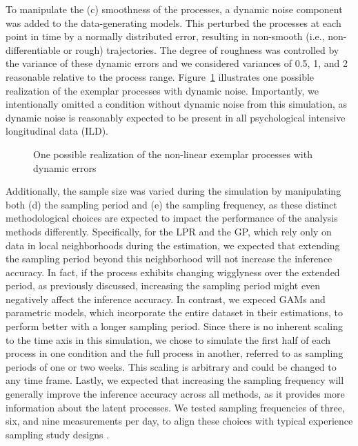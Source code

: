 \documentclass[man, floatsintext]{apa7}
\begin{document}
To manipulate the (c) smoothness of the processes, a dynamic noise
component was added to the data-generating models. This perturbed the
processes at each point in time by a normally distributed error,
resulting in non-smooth (i.e., non-differentiable or rough) trajectories.
The degree of roughness was controlled
by the variance of these dynamic errors and we considered variances of
0.5, 1, and 2 reasonable relative to the process range.
Figure~\ref{fig:exemplar_pn}
illustrates one possible realization of the exemplar processes with dynamic
noise. Importantly, we intentionally omitted a condition without dynamic noise
from this simulation, as dynamic noise is reasonably expected to be present in
all psychological intensive longitudinal data (ILD).

\begin{figure}[!ht]
  \caption{One possible realization of the non-linear exemplar processes
    with dynamic errors}
  \label{fig:exemplar_pn}
\end{figure}

Additionally, the sample size was varied during the simulation by manipulating
both (d) the sampling period and (e) the sampling frequency, as these distinct
methodological
choices are expected to impact the performance of the analysis methods
differently. Specifically, for the LPR and the GP, which rely only on data in
local neighborhoods during the estimation, we expected that extending the
sampling period beyond this
neighborhood will not increase the inference accuracy.
In fact, if the process exhibits
changing wigglyness over the extended period, as previously discussed,
increasing the sampling period might even negatively affect the inference
accuracy. In contrast, we expeced GAMs and parametric models, which incorporate
the entire dataset in their estimations, to perform better with a longer
sampling period. Since there is no inherent scaling to the time axis in this
simulation, we chose to simulate the first half of each process in one
condition and the full process in another, referred to as sampling periods of
one or two weeks. This scaling is arbitrary and could be changed to any time
frame. Lastly, we expected that increasing the sampling frequency will
generally improve the inference accuracy across all methods, as it provides
more information about the latent processes.
We tested sampling frequencies of three, six, and nine measurements per day,
to align these choices with typical experience sampling study designs
\parencite{wrzus_ecological_2023}.
\end{document}
